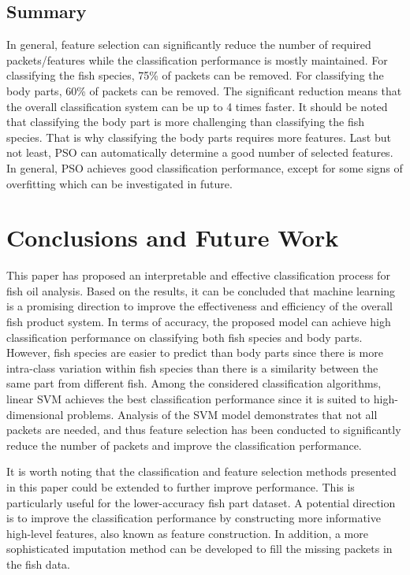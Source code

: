 \documentclass[runningheads]{llncs}
\begin{document}
\subsection{Summary}
\label{sec:results-feature-selection-discussion}

In general, feature selection can significantly reduce the number of required packets/features while the classification performance is mostly maintained. 
For classifying the fish species, 75\% of packets can be removed. 
For classifying the body parts, 60\% of packets can be removed. 
The significant reduction means that the overall classification system can be up to 4 times faster. 
It should be noted that classifying the body part is more challenging than classifying the fish species. 
That is why classifying the body parts requires more features. 
Last but not least, PSO can automatically determine a good number of selected features. 
In general, PSO achieves good classification performance, except for some signs of overfitting which can be investigated in future. 

\section{Conclusions and Future Work}

This paper has proposed an interpretable and effective classification process for fish oil analysis. 
Based on the results, it can be concluded that machine learning is a promising direction to improve the effectiveness and efficiency of the overall fish product system. 
In terms of accuracy, the proposed model can achieve high classification performance on classifying both fish species and body parts. 
However, fish species are easier to predict than body parts since there is more intra-class variation within fish species than there is a similarity between the same part from different fish. 
Among the considered classification algorithms, linear SVM achieves the best classification performance since it is suited to high-dimensional problems. 
Analysis of the SVM model demonstrates that not all packets are needed, and thus feature selection has been conducted to significantly reduce the number of packets and improve the classification performance. 

It is worth noting that the classification and feature selection methods presented in this paper could be extended to further improve performance. 
This is particularly useful for the lower-accuracy fish part dataset. 
A potential direction is to improve the classification performance by constructing more informative high-level features, also known as feature construction. 
In addition, a more sophisticated imputation method can be developed to fill the missing packets in the fish data.
\end{document}

